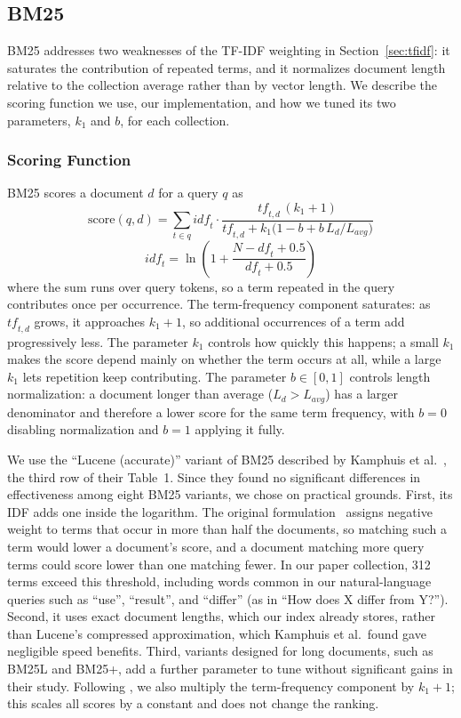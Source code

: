 \documentclass[sigconf,nonacm]{acmart}
\begin{document}
\subsection{BM25}
\label{sec:bm25}
BM25 addresses two weaknesses of the TF-IDF weighting in
Section~\ref{sec:tfidf}: it saturates the contribution of repeated terms,
and it normalizes document length relative to the collection average
rather than by vector length. We describe the scoring function we use,
our implementation, and how we tuned its two parameters, $k_1$ and $b$,
for each collection.
\subsubsection{Scoring Function}
BM25 scores a document $d$ for a query $q$ as
\begin{equation}
  \mathrm{score}(q,d) = \sum_{t \in q} \mathit{idf}_t \cdot
    \frac{\mathit{tf}_{t,d}\,(k_1 + 1)}
         {\mathit{tf}_{t,d} + k_1 \bigl(1 - b + b\,L_d / L_{\mathit{avg}}\bigr)}
  \label{eq:bm25}
\end{equation}
\begin{equation}
  \mathit{idf}_t = \ln\!\left(1 + \frac{N - \mathit{df}_t + 0.5}{\mathit{df}_t + 0.5}\right)
  \label{eq:idf}
\end{equation}
where the sum runs over query tokens, so a term repeated in the query
contributes once per occurrence. The term-frequency component saturates:
as $\mathit{tf}_{t,d}$ grows, it approaches $k_1 + 1$, so additional 
occurrences of a term add progressively less. The parameter $k_1$ controls
how quickly this happens; a small $k_1$ makes the score depend mainly on whether 
the term occurs at all, while a large $k_1$ lets repetition keep contributing.
The parameter $b \in [0, 1]$ controls length normalization: a document longer than 
average ($L_d > L_{\mathit{avg}}$) has a larger denominator and therefore a 
lower score for the same term frequency, with $b = 0$ disabling normalization
and $b = 1$ applying it fully.

We use the ``Lucene (accurate)'' variant of BM25 described by
Kamphuis et al.~\cite{kamphuis2020bm25}, the third row of their
Table~1. Since they found no significant differences in effectiveness
among eight BM25 variants, we chose on practical grounds. First, its
IDF adds one inside the logarithm. The original
formulation~\cite{robertson1994m} assigns negative weight to terms
that occur in more than half the documents, so matching such a term
would lower a document's score, and a document matching more query terms
could score lower than one matching fewer. In our paper collection, 312 terms
exceed this threshold, including words common in our natural-language
queries such as ``use'', ``result'', and ``differ'' (as in ``How does
X differ from Y?''). Second, it uses exact document lengths, which our
index already stores, rather than Lucene's compressed approximation,
which Kamphuis et al.\ found gave negligible speed benefits. Third,
variants designed for long documents, such as BM25L and BM25+, add a
further parameter to tune without significant gains in their study.
Following \citet{robertson1994m}, we also multiply the
term-frequency component by $k_1 + 1$; this scales all scores by a
constant and does not change the ranking.
\end{document}
